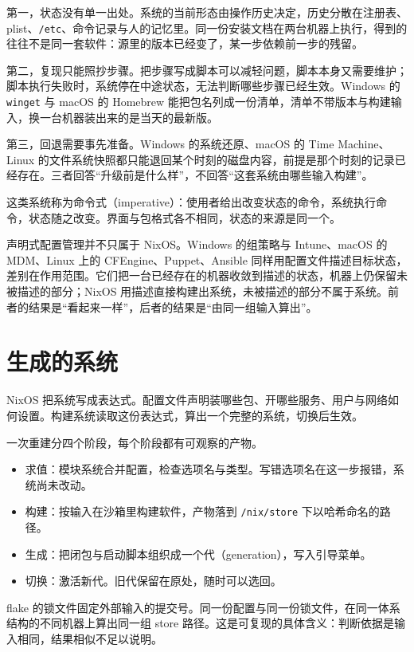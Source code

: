 第一，状态没有单一出处。系统的当前形态由操作历史决定，历史分散在注册表、plist、\texttt{/etc}、命令记录与人的记忆里。同一份安装文档在两台机器上执行，得到的往往不是同一套软件：源里的版本已经变了，某一步依赖前一步的残留。

第二，复现只能照抄步骤。把步骤写成脚本可以减轻问题，脚本本身又需要维护；脚本执行失败时，系统停在中途状态，无法判断哪些步骤已经生效。Windows 的 \texttt{winget} 与 macOS 的 Homebrew 能把包名列成一份清单，清单不带版本与构建输入，换一台机器装出来的是当天的最新版。

第三，回退需要事先准备。Windows 的系统还原、macOS 的 Time Machine、Linux 的文件系统快照都只能退回某个时刻的磁盘内容，前提是那个时刻的记录已经存在。三者回答“升级前是什么样”，不回答“这套系统由哪些输入构建”。

这类系统称为命令式（imperative）：使用者给出改变状态的命令，系统执行命令，状态随之改变。界面与包格式各不相同，状态的来源是同一个。

\begin{culturenote}
声明式配置管理并不只属于 NixOS。Windows 的组策略与 Intune、macOS 的 MDM、Linux 上的 CFEngine、Puppet、Ansible 同样用配置文件描述目标状态，差别在作用范围。它们把一台已经存在的机器收敛到描述的状态，机器上仍保留未被描述的部分；NixOS 用描述直接构建出系统，未被描述的部分不属于系统。前者的结果是“看起来一样”，后者的结果是“由同一组输入算出”。
\end{culturenote}

\section{生成的系统}

NixOS 把系统写成表达式。配置文件声明装哪些包、开哪些服务、用户与网络如何设置。构建系统读取这份表达式，算出一个完整的系统，切换后生效。

一次重建分四个阶段，每个阶段都有可观察的产物。

\begin{itemize}
  \item 求值：模块系统合并配置，检查选项名与类型。写错选项名在这一步报错，系统尚未改动。
  \item 构建：按输入在沙箱里构建软件，产物落到 \texttt{/nix/store} 下以哈希命名的路径。
  \item 生成：把闭包与启动脚本组织成一个代（generation），写入引导菜单。
  \item 切换：激活新代。旧代保留在原处，随时可以选回。
\end{itemize}

flake 的锁文件固定外部输入的提交号。同一份配置与同一份锁文件，在同一体系结构的不同机器上算出同一组 store 路径。这是可复现的具体含义：判断依据是输入相同，结果相似不足以说明。

